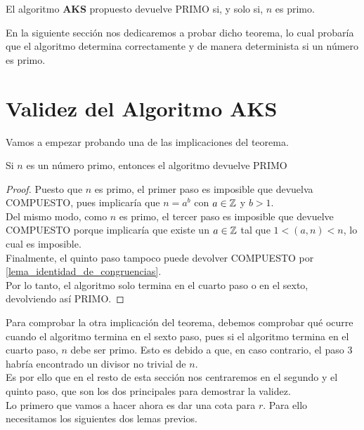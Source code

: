 \begin{teorema}\label{validez_algoritmo_aks}
	El algoritmo \textbf{AKS} propuesto devuelve PRIMO si, y solo si, $n$ es primo.
\end{teorema}

En la siguiente sección nos dedicaremos a probar dicho teorema, lo cual probaría que el algoritmo determina correctamente y de manera determinista si un número es primo.

\section{Validez del Algoritmo AKS}

Vamos a empezar probando una de las implicaciones del teorema.

\begin{lema}\label{devuelve_PRIMO_si_n_primo}
	Si $n$ es un número primo, entonces el algoritmo devuelve PRIMO
\end{lema}

\begin{proof}
	Puesto que $n$ es primo, el primer paso es imposible que devuelva COMPUESTO, pues implicaría que $n = a^b$ con $a \in \mathbb{Z}$ y $b > 1$.\\
	
	Del mismo modo, como $n$ es primo, el tercer paso es imposible que devuelve COMPUESTO porque implicaría que existe un $a \in \mathbb{Z}$ tal que $1 < (a, n) < n$, lo cual es imposible.\\
	
	Finalmente, el quinto paso tampoco puede devolver COMPUESTO por \autoref{lema_identidad_de_congruencias}.\\
	
	Por lo tanto, el algoritmo solo termina en el cuarto paso o en el sexto, devolviendo así PRIMO.
\end{proof}

Para comprobar la otra implicación del teorema, debemos comprobar qué ocurre cuando el algoritmo termina en el sexto paso, pues si el algoritmo termina en el cuarto paso, $n$ debe ser primo. Esto es debido a que, en caso contrario, el paso $3$ habría encontrado un divisor no trivial de $n$.\\

Es por ello que en el resto de esta sección nos centraremos en el segundo y el quinto paso, que son los dos principales para demostrar la validez.\\

Lo primero que vamos a hacer ahora es dar una cota para $r$. Para ello necesitamos los siguientes dos lemas previos.

